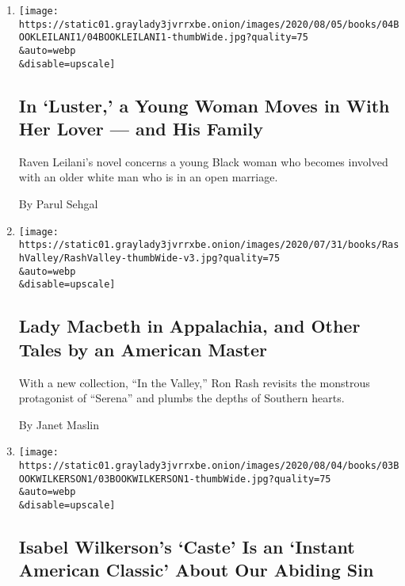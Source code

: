 \begin{enumerate}
\def\labelenumi{\arabic{enumi}.}
\item
  \href{/2020/08/04/books/review-luster-raven-leilani.html}{}

  \texttt{[image: https://static01.graylady3jvrrxbe.onion/images/2020/08/05/books/04BOOKLEILANI1/04BOOKLEILANI1-thumbWide.jpg?quality=75\\\&auto=webp\\\&disable=upscale]}

  \hypertarget{in-luster-a-young-woman-moves-in-with-her-lover--and-his-family}{%
  \subsection{In `Luster,' a Young Woman Moves in With Her Lover --- and
  His
  Family}\label{in-luster-a-young-woman-moves-in-with-her-lover--and-his-family}}

  Raven Leilani's novel concerns a young Black woman who becomes
  involved with an older white man who is in an open marriage.

  By Parul Sehgal
\item
  \href{/2020/08/02/books/ron-rash-in-valley-serena.html}{}

  \texttt{[image: https://static01.graylady3jvrrxbe.onion/images/2020/07/31/books/RashValley/RashValley-thumbWide-v3.jpg?quality=75\\\&auto=webp\\\&disable=upscale]}

  \hypertarget{lady-macbeth-in-appalachia-and-other-tales-by-an-american-master}{%
  \subsection{Lady Macbeth in Appalachia, and Other Tales by an American
  Master}\label{lady-macbeth-in-appalachia-and-other-tales-by-an-american-master}}

  With a new collection, ``In the Valley,'' Ron Rash revisits the
  monstrous protagonist of ``Serena'' and plumbs the depths of Southern
  hearts.

  By Janet Maslin
\item
  \href{/2020/07/31/books/review-caste-isabel-wilkerson-origins-of-our-discontents.html}{}

  \texttt{[image: https://static01.graylady3jvrrxbe.onion/images/2020/08/04/books/03BOOKWILKERSON1/03BOOKWILKERSON1-thumbWide.jpg?quality=75\\\&auto=webp\\\&disable=upscale]}

  \hypertarget{isabel-wilkersons-caste-is-an-instant-american-classic-about-our-abiding-sin}{%
  \subsection{Isabel Wilkerson's `Caste' Is an `Instant American
  Classic' About Our Abiding
  Sin}\label{isabel-wilkersons-caste-is-an-instant-american-classic-about-our-abiding-sin}}


\end{enumerate}

